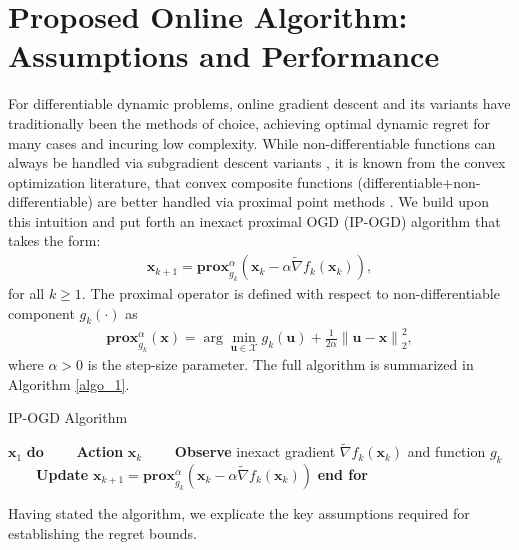 \documentclass[draftcls,onecolumn,12pt]{IEEEtran}
\theoremstyle{plain}
\def\u{\mathbf{u}}
\def\x{\mathbf{x}}
\def\cX {\mathcal{X}}
\def \nt {\tilde{\nabla}}
\def\prox{\textbf{prox}}
\providecommand{\norm}[1]{\left\|#1\right\|}
\providecommand{\pk}[1]{\prox_{g_k}^\alpha\!\!\left(#1\right)}
\theoremstyle{plain}
\theoremstyle{remark}
\begin{document}
\section{Proposed Online Algorithm: Assumptions and Performance}\label{seciii}
For differentiable dynamic problems, online gradient descent and its variants have traditionally been the methods of choice, achieving optimal dynamic regret for many cases \cite{yang2016tracking} and incuring low complexity. While non-differentiable functions can always be handled via subgradient descent variants  \cite{ISG_1,ISG_2,ISG_3}, it is known from the convex optimization literature, that convex composite functions (differentiable+non-differentiable) are better handled via proximal point methods  \cite{bertsekas2011incremental,nedic2017stochastic}. We build upon this intuition and put forth an inexact proximal OGD (IP-OGD) algorithm that takes the form:
\begin{align}\label{prox_update1}
\x_{k+1} = \pk{\x_{k} - \alpha \nt f_{k}(\x_{k})}, 
\end{align}
for all $k\geq 1$. The proximal operator is defined with respect to non-differentiable component $g_k(\cdot)$ as
\begin{align}\label{proximal}
\pk{\x} = \arg\min_{\u\in\cX}  g_{k}(\u) + \frac{1}{2\alpha} \norm{\u-\x}^2_2 ,
\end{align}
where $\alpha>0$ is the step-size parameter. The full algorithm is summarized in Algorithm \ref{algo_1}.  
	  \begin{algorithm}
	  	\caption{IP-OGD Algorithm}\label{algo_1}
	  	\begin{algorithmic}[1]
	  		 $\x_{1}$	  		
	  		 \textbf{do} 	  		
	  		\STATE \ \ \ \ \textbf{Action} $\x_k$  	  		
	  		\STATE \ \ \ \ \textbf{Observe} inexact gradient $\nt f_k(\x_k)$ and function $g_k$  		
	  		\STATE \ \ \ \ \textbf{Update} $\x_{k+1} = \pk{\x_{k} - \alpha \nt f_k(\x_k)}$   		
	  		\STATE \textbf{end for }
	  	\end{algorithmic}
	  		  	\label{algo:IP-OGD}
	  \end{algorithm}
Having stated the algorithm, we explicate the key assumptions required for establishing the regret bounds. 
\end{document}
